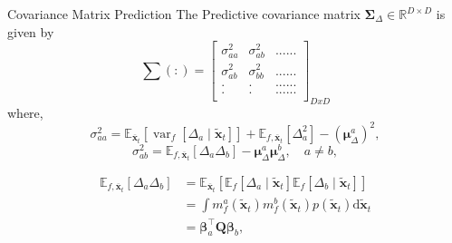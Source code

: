 \begin{frame}{Covariance Matrix Prediction}
    The Predictive covariance matrix $\mathbf{\Sigma}_{\Delta} \in \mathbb{R}^{D \times D}$ is given by 
    \begin{equation}
    \sum (:) = 	\begin{bmatrix}
                        \sigma_{a a}^2 & \sigma_{a b}^2 &......\\
                        \sigma_{a b}^2 & \sigma_{b b}^2 &......\\
                        .&.& ......\\
                        .&.& ......\\
                        \end{bmatrix}_{DxD}
\end{equation}
where, 
\begin{equation}\label{eq:sigma_aa}
\sigma_{a a}^2  =\mathbb{E}_{\overline{\boldsymbol{x}}_t}\left[\operatorname{var}_f\left[\Delta_a \mid \tilde{\boldsymbol{x}}_t\right]\right]+\mathbb{E}_{f, \overline{\boldsymbol{x}}_t}\left[\Delta_a^2\right]-\left(\boldsymbol{\mu}_{\Delta}^a\right)^2,
\end{equation}
\begin{equation}\label{eq:sigma_ab}
    \sigma_{a b}^2 =\mathbb{E}_{f, \overline{\boldsymbol{x}}_t}\left[\Delta_a \Delta_b\right]-\boldsymbol{\mu}_{\Delta}^a \boldsymbol{\mu}_{\Delta}^b, \quad a \neq b,
\end{equation}

\begin{equation}\label{eq:Eab}
\begin{aligned}
\mathbb{E}_{f, \overline{\boldsymbol{x}}_t}\left[\Delta_a \Delta_b\right] & =\mathbb{E}_{\overline{\boldsymbol{x}}_t}\left[\mathbb{E}_f\left[\Delta_a \mid \tilde{\boldsymbol{x}}_t\right] \mathbb{E}_f\left[\Delta_b \mid \tilde{\boldsymbol{x}}_t\right]\right] \\
& {=} \int m_f^a\left(\tilde{\boldsymbol{x}}_t\right) m_f^b\left(\tilde{\boldsymbol{x}}_t\right) p\left(\tilde{\boldsymbol{x}}_t\right) \mathrm{d} \tilde{\boldsymbol{x}}_t \\
& =\boldsymbol{\beta}_a^{\top} \boldsymbol{Q} \boldsymbol{\beta}_b,
\end{aligned}
\end{equation}
\end{frame}

